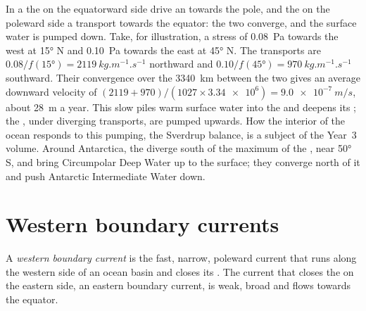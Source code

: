 In a  the  on the equatorward side drive an  towards the pole, and the  on the poleward side a transport
towards the equator: the two converge, and the surface water is pumped down. Take,
for illustration, a stress of \qty{0.08}{Pa} towards the west at \ang{15} N and
\qty{0.10}{Pa} towards the east at \ang{45} N. The transports are
$0.08/f(\ang{15}) = \qty{2119}{kg.m^{-1}.s^{-1}}$ northward and $0.10/f(\ang{45}) =
\qty{970}{kg.m^{-1}.s^{-1}}$ southward. Their convergence over the \qty{3340}{km}
between the two  gives an average downward velocity of
$(2119 + 970)/(1027 \times \num{3.34e6}) = \qty{9.0e-7}{m/s}$, about \qty{28}{m}
a year. This slow  piles warm surface water into the  and deepens its
; the , under diverging transports, are pumped upwards. How
the interior of the ocean responds to this pumping, the Sverdrup balance, is a
subject of the Year~3 volume. Around Antarctica, the  diverge south
of the maximum of the , near \ang{50} S, and bring Circumpolar Deep Water
up to the surface; they converge north of it and push Antarctic Intermediate Water
down.

\section{Western boundary currents}\label{sec:b1:ocean-circulation:wbc}

\begin{definition}\label{def:b1:ocean-circulation:wbc}
A \emph{western boundary current} is the fast,
narrow, poleward current that runs along the western side of an ocean basin and
closes its . The current that closes the  on the eastern side,
an eastern boundary current, is weak, broad and flows towards the equator.
\end{definition}

